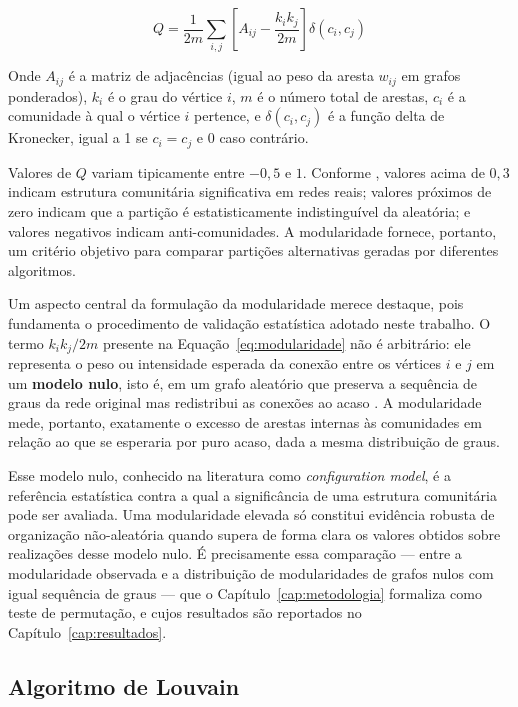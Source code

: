 \documentclass[
      12pt,
      a4paper,
      openright,
      oneside,
      chapter=TITLE,
      section=TITLE,
      english,
      french,
      spanish,
      brazilian
    ]{abntex2}
\begin{document}
    \begin{equation}
        Q = \frac{1}{2m} \sum_{i,j} \left[ A_{ij} - \frac{k_i k_j}{2m} \right] \delta(c_i, c_j)
        \label{eq:modularidade}
    \end{equation}
    
    Onde $A_{ij}$ é a matriz de adjacências (igual ao peso da aresta $w_{ij}$ em grafos ponderados), $k_i$ é o grau do vértice $i$, $m$ é o número total de arestas, $c_i$ é a comunidade à qual o vértice $i$ pertence, e $\delta(c_i, c_j)$ é a função delta de Kronecker, igual a 1 se $c_i = c_j$ e 0 caso contrário.
    
    Valores de $Q$ variam tipicamente entre $-0{,}5$ e $1$. Conforme , valores acima de $0{,}3$ indicam estrutura comunitária significativa em redes reais; valores próximos de zero indicam que a partição é estatisticamente indistinguível da aleatória; e valores negativos indicam anti-comunidades. A modularidade fornece, portanto, um critério objetivo para comparar partições alternativas geradas por diferentes algoritmos.
    
    Um aspecto central da formulação da modularidade merece destaque, pois fundamenta o procedimento de validação estatística adotado neste trabalho. O termo $k_i k_j / 2m$ presente na Equação~\ref{eq:modularidade} não é arbitrário: ele representa o peso ou intensidade esperada da conexão entre os vértices $i$ e $j$ em um \textbf{modelo nulo}, isto é, em um grafo aleatório que preserva a sequência de graus da rede original mas redistribui as conexões ao acaso \cite{newman2010}. A modularidade mede, portanto, exatamente o excesso de arestas internas às comunidades em relação ao que se esperaria por puro acaso, dada a mesma distribuição de graus.
    
    Esse modelo nulo, conhecido na literatura como \textit{configuration model}, é a referência estatística contra a qual a significância de uma estrutura comunitária pode ser avaliada. Uma modularidade elevada só constitui evidência robusta de organização não-aleatória quando supera de forma clara os valores obtidos sobre realizações desse modelo nulo. É precisamente essa comparação --- entre a modularidade observada e a distribuição de modularidades de grafos nulos com igual sequência de graus --- que o Capítulo~\ref{cap:metodologia} formaliza como teste de permutação, e cujos resultados são reportados no Capítulo~\ref{cap:resultados}.
    
    \subsection{Algoritmo de Louvain}
    
\end{document}
